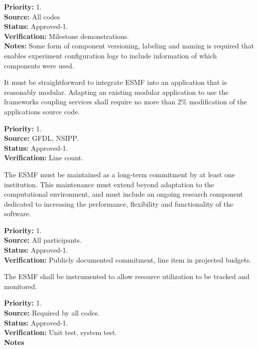 \begin{reqlist}
{\bf Priority:} 1. \\
{\bf Source:} All codes\\
{\bf Status:} Approved-1. \\
{\bf Verification:} Milestone demonstrations.\\
{\bf Notes:} Some form of component versioning, labeling and naming
is required that enables experiment configuration logs
to include information of which components were used.
\end{reqlist}

It must be straightforward to integrate ESMF into an application 
that is reasonably modular. Adapting an existing modular application
to use the frameworks coupling services shall require no more
than 2\% modification of the applications source code.
\begin{reqlist}
{\bf Priority:} 1. \\
{\bf Source:} GFDL, NSIPP. \\
{\bf Status:} Approved-1. \\
{\bf Verification:} Line count.
\end{reqlist}

The ESMF must be maintained as a long-term commitment by at least one
institution.  This maintenance must extend beyond adaptation to the 
computational environment, and must include an ongoing research component
dedicated to increasing the performance, flexibility and functionality of
the software.
\begin{reqlist}
{\bf Priority:} 1. \\
{\bf Source:} All participants. \\
{\bf Status:} Approved-1. \\
{\bf Verification:} Publicly documented commitment, line item in 
projected budgets.
\end{reqlist}


The ESMF shall be instrumented to allow resource utilization
to be tracked and monitored.
\label{req:gr:error_handling}
\begin{reqlist}
  {\bf Priority:} 1. \\
  {\bf Source:} Required by all codes. \\
  {\bf Status:} Approved-1. \\
  {\bf Verification:} Unit test, system test.\\
  {\bf Notes}
\end{reqlist}





